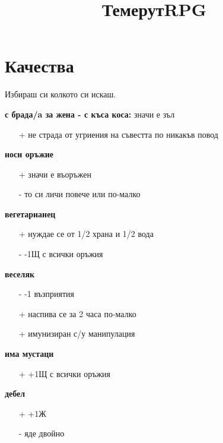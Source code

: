\documentclass{article}
\title{ТемерутRPG}
\author{}
\begin{document}
\maketitle

\section{Качества}
Избираш си колкото си искаш.  \\
\par

\textbf{с брада/a за жена - с къса коса:} значи е зъл
\begin{itemize}
\item[+] не страда от угриения на съвестта по никакъв повод  \\
\end{itemize}

\textbf{носи оръжие}
\begin{itemize}
\item[+] значи е въоръжен
\item[-] то си личи повече или по-малко  \\
\end{itemize}

\textbf{вегетарианец}
\begin{itemize}
\item[+] нуждае се от 1/2 храна и 1/2 вода
\item[-] -1Щ с всички оръжия  \\
\end{itemize}

\textbf{веселяк}
\begin{itemize}
\item[-] -1 възприятия
\item[+] наспива се за 2 часа по-малко
\item[+] имунизиран с/у манипулация  \\
\end{itemize}

\textbf{има мустаци}
\begin{itemize}
\item[+] +1Щ с всички оръжия  \\
\end{itemize}

\textbf{дебел}
\begin{itemize}                                                                 
\item[+] +1Ж
\item[-] яде двойно  \\
\end{itemize}
\end{document}
